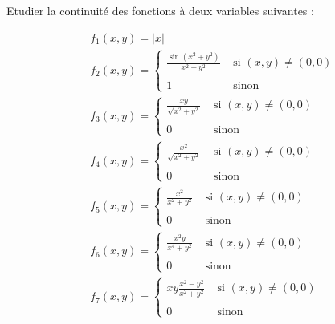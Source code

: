 \begin{exercice}

Etudier la continuité des fonctions à deux variables suivantes :

\begin{align*}
& f_1(x,y) = |x| \\ 
& f_2(x,y) = \left\{ \begin{array}{ll}
\displaystyle \frac{\sin(x^2 + y^2)}{x^2 + y^2} & \mbox{ si } (x,y)\neq(0,0)\\\\
1 & \mbox{ sinon}
\end{array} \right.\\
& f_3(x,y) = \left\{ \begin{array}{ll}
\displaystyle \frac{xy}{\sqrt{x^2 + y^2}} & \mbox{ si } (x,y)\neq(0,0)\\\\
0 & \mbox{ sinon}
\end{array} \right.\\
& f_4(x,y) = \left\{ \begin{array}{ll}
\displaystyle \frac{x^2}{\sqrt{x^2 + y^2}} & \mbox{ si } (x,y)\neq(0,0)\\\\
0 & \mbox{ sinon}
\end{array} \right.\\
& f_5(x,y) = \left\{ \begin{array}{ll}
\displaystyle \frac{x^2}{{x^2 + y^2}} & \mbox{ si } (x,y)\neq(0,0)\\\\
0 & \mbox{ sinon}
\end{array} \right.\\
& f_6(x,y) =  \left\{ \begin{array}{ll}
\displaystyle \frac{x^2 y}{x^4 + y^2} & \mbox{ si } (x,y)\neq(0,0)\\\\
0 & \mbox{ sinon}
\end{array} \right.\\
& f_7(x,y) = \left\{ \begin{array}{ll}
\displaystyle xy \frac{x^2 - y^2}{x^2 + y^2} & \mbox{ si } (x,y)\neq(0,0)\\\\
0 & \mbox{ sinon}
\end{array} \right.
\end{align*}

\end{exercice}

\newpage

